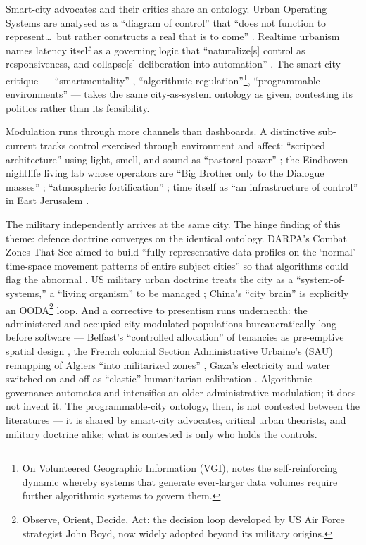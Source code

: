 Smart-city advocates and their critics share an ontology. Urban Operating Systems are analysed as a ``diagram of control'' that ``does not function to represent\dots\ but rather constructs a real that is to come'' \parencite[p.~7]{marvin2017}. Realtime urbanism names latency itself as a governing logic that ``naturalize[s] control as responsiveness, and collapse[s] deliberation into automation'' \parencite[p.~159]{lotfijam2025}. The smart-city critique — ``smartmentality'' \parencite[p.~224]{kitchin2018}, ``algorithmic regulation''\footnote{On Volunteered Geographic Information (VGI), \textcite[p.~106]{tenney2016} notes the self-reinforcing dynamic whereby systems that generate ever-larger data volumes require further algorithmic systems to govern them.}\parencite{tenney2016}, ``programmable environments'' \parencite{williamson2015} — takes the same city-as-system ontology as given, contesting its politics rather than its feasibility.

Modulation runs through more channels than dashboards. A distinctive sub-current tracks control exercised through environment and affect: ``scripted architecture'' using light, smell, and sound as ``pastoral power'' \parencite[p.~7]{schuilenburg2018}; the Eindhoven nightlife living lab whose operators are ``Big Brother only to the Dialogue masses'' \parencite{jacobs2024}; ``atmospheric fortification'' \parencite[p.~1]{fregonese2024}; time itself as ``an infrastructure of control'' in East Jerusalem \parencite[p.~4]{baumann2019}.

The military independently arrives at the same city. The hinge finding of this theme: defence doctrine converges on the identical ontology. DARPA's Combat Zones That See aimed to build ``fully representative data profiles on the `normal' time-space movement patterns of entire subject cities'' so that algorithms could flag the abnormal \parencite[p.~35]{graham2008}. US military urban doctrine treats the city as a ``system-of-systems,'' a ``living organism'' to be managed \parencite[pp.~406,~413]{danielsson2025}; China's ``city brain'' is explicitly an OODA\footnote{Observe, Orient, Decide, Act: the decision loop developed by US Air Force strategist John Boyd, now widely adopted beyond its military origins.} loop\parencite[pp.~3--4]{weber2023}. And a corrective to presentism runs underneath: the administered and occupied city modulated populations bureaucratically long before software — Belfast's ``controlled allocation'' of tenancies as pre-emptive spatial design \parencite[p.~9]{coyles2017}, the French colonial Section Administrative Urbaine's (SAU) remapping of Algiers ``into militarized zones'' \parencite[p.~198]{crane2017}, Gaza's electricity and water switched on and off as ``elastic'' humanitarian calibration \parencite[p.~1]{salamanca2011}. Algorithmic governance automates and intensifies an older administrative modulation; it does not invent it. The programmable-city ontology, then, is not contested between the literatures — it is shared by smart-city advocates, critical urban theorists, and military doctrine alike; what is contested is only who holds the controls.

